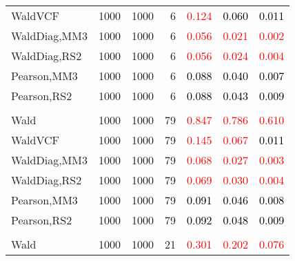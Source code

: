 \documentclass[
]{article}
\begin{document}
\begin{table}[H]
{\begin{tabular}[t]{lrrrrrr}
\hspace{1em}WaldVCF & 1000 & 1000 & 6 & \textcolor{red}{0.124} & \textcolor{black}{0.060} & \textcolor{black}{0.011}\\
\hspace{1em}WaldDiag,MM3 & 1000 & 1000 & 6 & \textcolor{red}{0.056} & \textcolor{red}{0.021} & \textcolor{red}{0.002}\\
\hspace{1em}WaldDiag,RS2 & 1000 & 1000 & 6 & \textcolor{red}{0.056} & \textcolor{red}{0.024} & \textcolor{red}{0.004}\\
\hspace{1em}Pearson,MM3 & 1000 & 1000 & 6 & \textcolor{black}{0.088} & \textcolor{black}{0.040} & \textcolor{black}{0.007}\\
\hspace{1em}Pearson,RS2 & 1000 & 1000 & 6 & \textcolor{black}{0.088} & \textcolor{black}{0.043} & \textcolor{black}{0.009}\\
\addlinespace[0.3em]
\multicolumn{7}{l}{\textbf{1F 15V}}\\
\hspace{1em}Wald & 1000 & 1000 & 79 & \textcolor{red}{0.847} & \textcolor{red}{0.786} & \textcolor{red}{0.610}\\
\hspace{1em}WaldVCF & 1000 & 1000 & 79 & \textcolor{red}{0.145} & \textcolor{red}{0.067} & \textcolor{black}{0.011}\\
\hspace{1em}WaldDiag,MM3 & 1000 & 1000 & 79 & \textcolor{red}{0.068} & \textcolor{red}{0.027} & \textcolor{red}{0.003}\\
\hspace{1em}WaldDiag,RS2 & 1000 & 1000 & 79 & \textcolor{red}{0.069} & \textcolor{red}{0.030} & \textcolor{red}{0.004}\\
\hspace{1em}Pearson,MM3 & 1000 & 1000 & 79 & \textcolor{black}{0.091} & \textcolor{black}{0.046} & \textcolor{black}{0.008}\\
\hspace{1em}Pearson,RS2 & 1000 & 1000 & 79 & \textcolor{black}{0.092} & \textcolor{black}{0.048} & \textcolor{black}{0.009}\\
\addlinespace[0.3em]
\multicolumn{7}{l}{\textbf{2F 10V}}\\
\hspace{1em}Wald & 1000 & 1000 & 21 & \textcolor{red}{0.301} & \textcolor{red}{0.202} & \textcolor{red}{0.076}\\

\end{tabular}}
\end{table}
\end{document}

